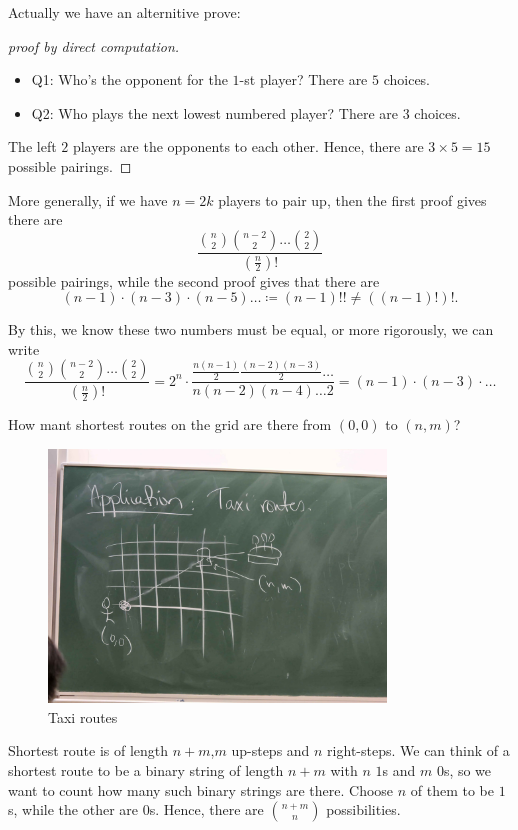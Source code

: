 Actually we have an alternitive prove:
\begin{proof}[proof by direct computation]
    \vphantom{text}
\begin{itemize}
    \item Q1: Who's the opponent for the \(1\)-st player? There are \(5\) choices. 
    \item Q2: Who plays the next lowest numbered player? There are \(3\) choices.   
\end{itemize}
The left \(2\) players are the opponents to each other. Hence, there are \(3 \times 5 = 15\)possible pairings.  
\end{proof}

More generally, if we have \(n = 2k\) players to pair up, then the first proof gives there are 
\[
    \frac{\binom{n}{2} \binom{n-2}{2}\dots \binom{2}{2}}{\left( \frac{n}{2} \right)!}
\]possible pairings, while the second proof gives that there are 
\[
    (n-1) \cdot (n - 3) \cdot (n-5) \dots \coloneqq (n-1)!! \neq \left( (n-1)! \right)!  .
\]

By this, we know these two numbers must be equal, or more rigorously, we can write 
\[
  \frac{\binom{n}{2} \binom{n-2}{2}\dots \binom{2}{2}}{\left( \frac{n}{2} \right)!} = 2^n \cdot \frac{\frac{n(n-1)}{2} \frac{(n-2)(n-3)}{2} \dots }{n(n-2)(n-4)\dots 2}  = (n-1) \cdot (n-3) \cdot \dots 
\]

\begin{eg}
    How mant shortest routes on the grid are there from \((0, 0)\) to \((n, m)\)?  
\end{eg}

\begin{figure}[H]
    \centering
    \includegraphics[width=0.8\textwidth]{./Figures/20250909_155011.jpg}
    \caption{Taxi routes}
    \label{fig:taxi routes}
\end{figure}
\begin{explanation}
    Shortest route is of length \(n + m\),\(m\) up-steps and \(n\) right-steps. We can think of a shortest route to be a binary string of length \(n + m\) with \(n\) \(1\)s and \(m\) \(0\)s, so we want to count how many such binary strings are there. Choose \(n\) of them to be \(1\)s, while the other are \(0\)s.  Hence, there are \(\binom{n+m}{n}\) possibilities.     
\end{explanation}

